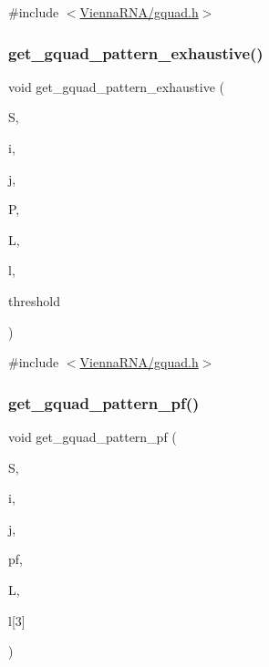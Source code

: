 {\ttfamily \#include $<$\mbox{\hyperlink{gquad_8h}{Vienna\+R\+N\+A/gquad.\+h}}$>$}

\mbox{\label{group__gquads_gae72088f0c674df7ac1c650c8bf02fad8}} 
\subsubsection{\texorpdfstring{get\+\_\+gquad\+\_\+pattern\+\_\+exhaustive()}{get\_gquad\_pattern\_exhaustive()}}
{\footnotesize\ttfamily void get\+\_\+gquad\+\_\+pattern\+\_\+exhaustive (\begin{DoxyParamCaption}\item[{short $\ast$}]{S,  }\item[{int}]{i,  }\item[{int}]{j,  }\item[{\mbox{\hyperlink{group__energy__parameters_ga8a69ca7d787e4fd6079914f5343a1f35}{vrna\+\_\+param\+\_\+t}} $\ast$}]{P,  }\item[{int $\ast$}]{L,  }\item[{int $\ast$}]{l,  }\item[{int}]{threshold }\end{DoxyParamCaption})}



{\ttfamily \#include $<$\mbox{\hyperlink{gquad_8h}{Vienna\+R\+N\+A/gquad.\+h}}$>$}

\mbox{\label{group__gquads_gaafaf18c4a262d12f6698df72c071f641}} 
\subsubsection{\texorpdfstring{get\+\_\+gquad\+\_\+pattern\+\_\+pf()}{get\_gquad\_pattern\_pf()}}
{\footnotesize\ttfamily void get\+\_\+gquad\+\_\+pattern\+\_\+pf (\begin{DoxyParamCaption}\item[{short $\ast$}]{S,  }\item[{int}]{i,  }\item[{int}]{j,  }\item[{\mbox{\hyperlink{group__energy__parameters_ga01d8b92fe734df8d79a6169482c7d8d8}{vrna\+\_\+exp\+\_\+param\+\_\+t}} $\ast$}]{pf,  }\item[{int $\ast$}]{L,  }\item[{int}]{l\mbox{[}3\mbox{]} }\end{DoxyParamCaption})}



